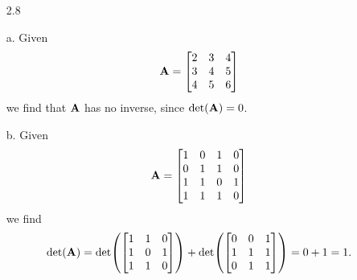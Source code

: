 \documentclass[11pt]{article}
\begin{document}
\begin{enumerate}
    \item[2.8]

    \item[a.]
          Given
          \[
              \mathbf{A} =
              \begin{bmatrix}
                  2 & 3 & 4 \\
                  3 & 4 & 5 \\
                  4 & 5 & 6
              \end{bmatrix}
          \]
          we find that $\mathbf{A}$ has no inverse, since $\det(\mathbf{A}) = 0$.

    \item[b.]
          Given
          \[
              \mathbf{A} =
              \begin{bmatrix}
                  1 & 0 & 1 & 0 \\
                  0 & 1 & 1 & 0 \\
                  1 & 1 & 0 & 1 \\
                  1 & 1 & 1 & 0
              \end{bmatrix}
          \]
          we find
          \[
              \det(\mathbf{A}) = \det \!\left(
                  \begin{bmatrix}
                      1 & 1 & 0 \\
                      1 & 0 & 1 \\
                      1 & 1 & 0
                  \end{bmatrix}
              \right)
              + \det \!\left(
                  \begin{bmatrix}
                      0 & 0 & 1 \\
                      1 & 1 & 1 \\
                      0 & 1 & 1
                  \end{bmatrix}
              \right)
              = 0 + 1
              = 1.
          \]


\end{enumerate}
\end{document}
